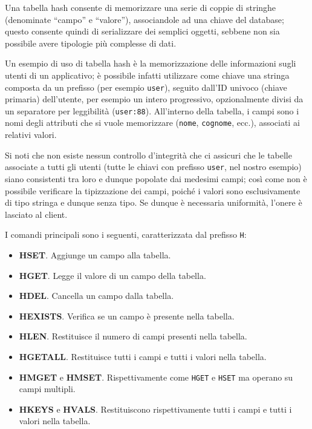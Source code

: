Una tabella hash consente di memorizzare una serie di coppie di stringhe (denominate ``campo'' e
``valore''), associandole ad una chiave del database; questo consente quindi di serializzare dei
semplici oggetti, sebbene non sia possibile avere tipologie più complesse di dati.

Un esempio di uso di tabella hash è la memorizzazione delle informazioni sugli utenti di un
applicativo; è possibile infatti utilizzare come chiave una stringa composta da un prefisso (per
esempio \verb|user|), seguito dall'ID univoco (chiave primaria) dell'utente, per esempio un intero
progressivo, opzionalmente divisi da un separatore per leggibilità (\verb|user:88|). All'interno
della tabella, i campi sono i nomi degli attributi che si vuole memorizzare (\verb|nome|,
\verb|cognome|, ecc.), associati ai relativi valori.

Si noti che non esiste nessun controllo d'integrità che ci assicuri che le tabelle associate a tutti
gli utenti (tutte le chiavi con prefisso \verb|user|, nel nostro esempio) siano consistenti tra loro
e dunque popolate dai medesimi campi; così come non è possibile verificare la tipizzazione dei
campi, poiché i valori sono esclusivamente di tipo stringa e dunque senza tipo. Se dunque è
necessaria uniformità, l'onere è lasciato al client.

I comandi principali sono i seguenti, caratterizzata dal prefisso \verb|H|:

\begin{itemize}
	\medskip
	\item \textbf{HSET}. Aggiunge un campo alla tabella.
	\item \textbf{HGET}. Legge il valore di un campo della tabella.
	\item \textbf{HDEL}. Cancella un campo dalla tabella.
	\item \textbf{HEXISTS}. Verifica se un campo è presente nella tabella.
	\item \textbf{HLEN}. Restituisce il numero di campi presenti nella tabella.
	\item \textbf{HGETALL}. Restituisce tutti i campi e tutti i valori nella tabella.
	\item \textbf{HMGET} e \textbf{HMSET}. Rispettivamente come \verb|HGET| e \verb|HSET| ma operano
	su campi multipli.
	\item \textbf{HKEYS} e \textbf{HVALS}. Restituiscono rispettivamente tutti i campi e tutti i
	valori nella tabella.
\end{itemize}


